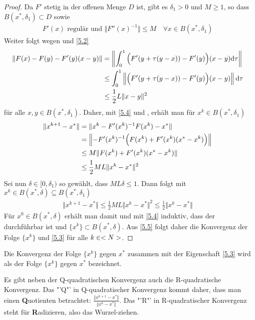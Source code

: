 \begin{proof}
	Da $F'$ stetig in der offenen Menge $D$ ist, gibt es $\delta_1>0$ und $M\ge 1$, so dass $B(x^\ast,\delta_1)\subset D$ sowie
	\begin{align}
		\label{5.4}
		F'(x)\text{ regulär und } \Vert F''(x)^{-1}\Vert\le M \quad\forall x\in B(x^\ast,\delta_1)
	\end{align}
	Weiter folgt wegen  und \cref{5.2}
	\begin{align}
		\Vert F(x) - F(y) - F'(y)(x-y)\Vert &= \left\Vert \int_0^1 \Big(F'(y+\tau(y-x)) - F'(y)\Big)(x-y)\mathrm{d} \tau\right\Vert \notag \\
		&\le \int_0^1 \left\Vert \Big(F'(y+\tau(y-x)) - F'(y)\Big)(x-y) \right\Vert\mathrm{d}\tau \notag \\
		&\le \frac{1}{2} L\Vert x-y\Vert^2 \notag
	\end{align}
	für alle $x,y\in B(x^\ast,\delta_1)$. Daher, mit \cref{5.4} und , erhält man für $x^k\in B(x^\ast,\delta_1)$
	\begin{align}
		\Vert x^{k+1}-x^\ast\Vert &= \Vert x^k - F'(x^k)^{-1}F(x^k) - x^\ast\Vert \notag \\
		&= \left\Vert -F'(x^k)^{-1}\Big(F(x^k) + F'(x ^k)(x^\ast-x^k)\Big)\right\Vert \notag \\
		&\le M\Vert F(x^k) + F'(x^k)(x^\ast-x^k)\Vert \notag \\
		&\le \frac{1}{2}ML\Vert x^k-x^\ast\Vert^2\notag
	\end{align}
	Sei nun $\delta\in [0,\delta_1)$ so gewählt, dass $ML\delta\le 1$. Dann folgt mit $x^k\in B(x^\ast,\delta)\subseteq B(x^\ast,\delta_1)$
	\begin{align}
		\label{5.5}
		\Vert x^{k+1}-x^\ast\Vert \le \frac{1}{2}ML\Vert x^k-x^\ast\Vert^2\le \frac{1}{2}\Vert x^k-x^\ast\Vert
	\end{align}
	Für $x^0\in B(x^\ast,\delta)$ erhält man damit und mit \cref{5.4} induktiv, dass der  durchführbar ist und $\{x^k\}\subset B(x^\ast,\delta)$. Aus \cref{5.5} folgt daher die Konvergenz der Folge $\{x^k\}$ und \cref{5.3} für alle $k\in<N>$.
\end{proof}

Die Konvergenz der Folge $\{x^k\}$ gegen $x^\ast$ zusammen mit der Eigenschaft \cref{5.3} wird als  der Folge $\{x^k\}$ gegen $x^\ast$ bezeichnet.

\begin{*anmerkung}
	Es gibt neben der Q-quadratischen Konvergenz auch die R-quadratische Konvergenz. Das "'Q"' in Q-quadratischer Konvergenz kommt daher, dass man einen \textbf{Q}uotienten betrachtet: $\frac{\Vert x^{k+1}-x^\ast\Vert}{\Vert x^k-x^\ast\Vert}$. Das "'R"' in R-quadratischer Konvergenz steht für \textbf{R}adizieren, also das Wurzel-ziehen.
\end{*anmerkung}

